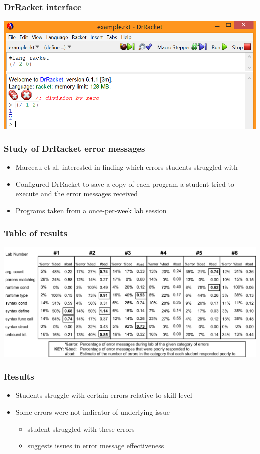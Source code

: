 \documentclass{beamer}
\begin{document}
\begin{frame}
	\frametitle{DrRacket interface}
			\includegraphics[keepaspectratio, width= 1.0 \textwidth]{drracketGUI.png}

\end{frame}

\begin{frame}
	\frametitle{Study of DrRacket error messages}
		\begin{itemize}
			\item Marceau et al. interested in finding which errors students struggled with
			\item Configured DrRacket to save a copy of each program a student tried to execute and the error messages received
			\item Programs taken from a once-per-week lab session
		\end{itemize} 

\end{frame}

\begin{frame}
	\frametitle{Table of results}
	\includegraphics[keepaspectratio, width=1.0 \textwidth]{MEE-data.pdf}

\end{frame}


\begin{frame}[fragile]
	\frametitle{Results}
		\begin{itemize}
			\item Students struggle with certain errors relative to skill level
			\item Some errors were not indicator of underlying issue
			\begin{itemize}
			\item student struggled with these errors
			\item suggests issues in error message effectiveness
			\end{itemize}
		\end{itemize}

\end{frame}
\end{document}
